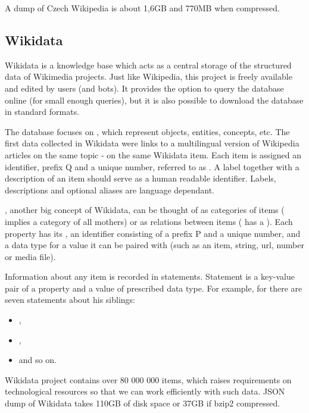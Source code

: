A dump of Czech Wikipedia is about 1,6GB and 770MB when compressed.

\subsection{Wikidata}

Wikidata is a knowledge base which acts as a central storage of the structured data of Wikimedia projects. Just like Wikipedia, this project is freely available and edited by users (and bots). It provides the option to query the database online (for small enough queries), but it is also possible to download the database in standard formats.

The database focuses on , which represent objects, entities, concepts, etc.  The first data collected in Wikidata were links to a multilingual version of Wikipedia articles on the same topic - on the same Wikidata item. Each item is assigned an identifier, prefix Q and a unique number, referred to as . A label together with a description of an item should serve as a human readable identifier. Labels, descriptions and optional aliases are language dependant.

, another big concept of Wikidata, can be thought of as categories of items ( implies a category of all mothers) or as relations between items ( has a  ). Each property has its , an identifier consisting of a prefix P and a unique number, and a data type for a value it can be paired with (such as an item, string, url, number or media file). 

Information about any item is recorded in statements. Statement is a key-value pair of a property and a value of prescribed data type. For example, for  there are seven statements about his siblings:
\begin{itemize}
\item {} ,
\item {} ,
\item {}  and so on.
\end{itemize}  

Wikidata project contains over 80 000 000 items, which raises  requirements on technological resources so that we can work efficiently with such data. JSON dump of Wikidata takes 110GB of disk space or 37GB if bzip2 compressed.

